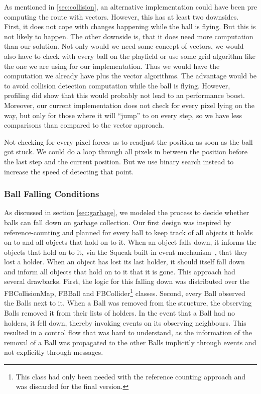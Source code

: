 As mentioned in \ref{sec:collision}, an alternative implementation could have been pre computing the route
with vectors. However, this has at least two downsides. First, it does not cope with changes happening
while the ball is flying. But this is not likely to happen. The other downside is, that it does need more
computation than our solution. Not only would we need some concept of vectors, we would also have to check
with every ball on the playfield or use some grid algorithm like the one we are using for our implementation.
Thus we would have the computation we already have plus the vector algorithms. The advantage would be to avoid
collision detection computation while the ball is flying. However, profiling did show that this would probably
not lead to an performance boost. Moreover, our current implementation does not check for every pixel lying
on the way, but only for those where it will ``jump'' to on every step, so we have less comparisons than compared
to the vector approach.

Not checking for every pixel forces us to readjust the position as soon as the ball got stuck. We could do a loop
through all pixels in between the position before the last step and the current position. But we use binary search
instead to increase the speed of detecting that point.
%
\subsubsection{Ball Falling Conditions}
As discussed in section \ref{sec:garbage}, we modeled the process to decide whether balls can fall down on garbage collection. Our first design was inspired by reference-counting and planned for every ball to keep track of all objects it holds on to and all objects that hold on to it. When an object falls down, it informs the objects that hold on to it, via the Squeak built-in event mechanism~\cite{website:squeakwikiObserver}, that they lost a holder. When an object has lost its last holder, it should itself fall down and inform all objects that hold on to it that it is gone.
This approach had several drawbacks. First, the logic for this falling down was distributed over the FBCollisionMap, FBBall and FBCollider\footnote{This class had only been needed with the reference counting approach and was discarded for the final version.} classes.
Second, every Ball observed the Balls next to it. When a Ball was removed from the structure, the observing Balls removed it from their lists of holders. In the event that a Ball had no holders, it fell down, thereby invoking events on its observing neighbours.
This resulted in a control flow that was hard to understand, as the information of the removal of a Ball was propagated to the other Balls implicitly through events and not explicitly through messages.

